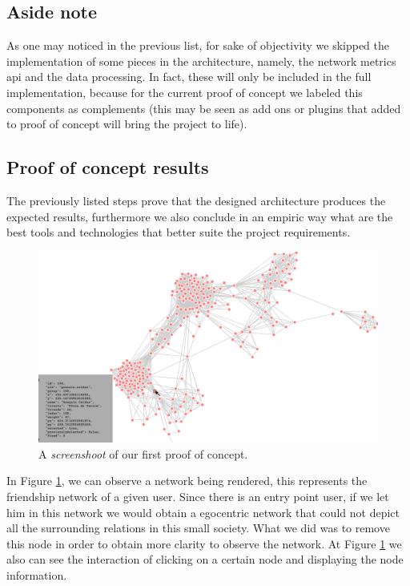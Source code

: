 \subsection*{Aside note}
As one may noticed in the previous list, for sake of objectivity we skipped the implementation of some pieces in the architecture,
namely, the network metrics \gls{api} and the data processing. In fact, these will only be included in the full implementation, because for the current proof
of concept we labeled this components as complements (this may be seen as add ons or plugins that added to proof of concept will bring the
project to life).\\

\subsection{Proof of concept results}
\indent The previously listed steps prove that the designed architecture produces the expected results, furthermore we also conclude in an empiric way what are the best tools and technologies that better suite the project requirements.\\

\begin{figure}[h!]
\begin{center}
  \hspace*{-0.8in}
  \includegraphics[width=1.2\textwidth]{img/proof-of-concept.png}
\end{center}
\caption{\label{img:poc} A \textit{screenshoot} of our first proof of concept.}
\end{figure}

\indent In Figure \ref{img:poc}, we can observe a network being rendered, this represents the friendship network of a given user. Since there is an entry point user, if we let him in this network we would obtain a egocentric network that could not depict all the surrounding relations in this small society. What we did was
to remove this node in order to obtain more clarity to observe the network. At Figure \ref{img:poc} we also can see the interaction of clicking on a certain node and displaying the node information.

